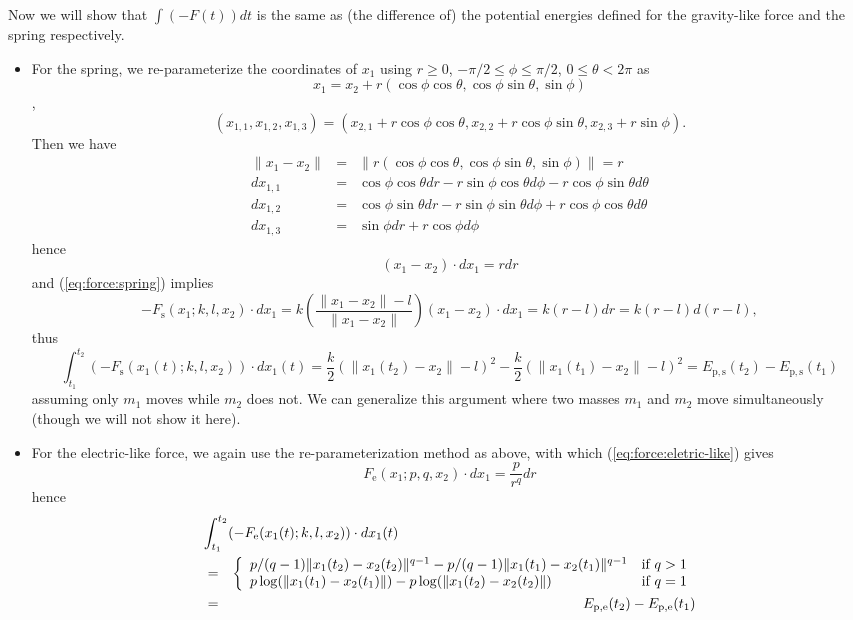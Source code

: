 \documentclass{article}
\begin{document}
Now we will show that $\int (-F(t)) dt $ is the same as (the difference of) the potential energies defined for
the gravity-like force and the spring respectively.
\begin{itemize}
\item
For the spring,
we re-parameterize the coordinates of $x_1$ using $r\geq0$, $-\pi/2\leq \phi \leq \pi/2$, $0\leq \theta < 2\pi$
as
\[
	x_1 = x_2 + r (\cos\phi \cos\theta, \cos\phi \sin\theta, \sin\phi)
\]
\ie,
\[
(x_{1,1}, x_{1,2}, x_{1,3}) = (x_{2,1} + r \cos\phi \cos\theta, x_{2,2} + r \cos\phi \sin\theta, x_{2,3} + r \sin\phi).
\]
Then we have
\begin{eqnarray*}
\|x_1 - x_2\|
&=&
\|
r( \cos\phi \cos\theta,  \cos\phi \sin\theta,  \sin\phi)
\|
=r
\\
d x_{1,1}
&=&
\cos\phi \cos\theta dr
-r\sin\phi \cos\theta d\phi
-r\cos\phi \sin\theta d\theta
\\
d x_{1,2}
&=&
\cos\phi \sin\theta dr
- r \sin\phi \sin\theta d\phi
+ r \cos\phi \cos\theta d\theta
\\
d x_{1,3}
&=&
\sin\phi dr
+ r \cos\phi d\phi
\end{eqnarray*}
hence
\[
(x_1-x_2)\cdot dx_1 = r dr
\]
and
(\ref{eq:force:spring})
implies
\[
-F_\mathrm{s}(x_1;k,l,x_2)\cdot dx_1
=
	k
	\left(
	\frac{\|x_1-x_2\| - l}{\|x_1-x_2\|}
	\right)
	(x_1-x_2)
	\cdot dx_1
= k (r-l) dr
= k (r-l) d(r-l),
\]
thus
\begin{equation}
	\int_{t_1}^{t_2} (-F_\mathrm{s}(x_1(t);k,l,x_2))\cdot dx_1(t)
=
	\frac{k}{2}(\|x_1(t_2)-x_2\|-l)^2
	-
	\frac{k}{2}(\|x_1(t_1)-x_2\|-l)^2
=
	E_\mathrm{p,s}(t_2)
	-
	E_\mathrm{p,s}(t_1)
\end{equation}
assuming only $m_1$ moves while $m_2$ does not.
We can generalize this argument where two masses $m_1$ and $m_2$
move simultaneously (though we will not show it here).

\item For the electric-like force,
we again use the re-parameterization method as above,
with which (\ref{eq:force:eletric-like}) gives
\[
F_\mathrm{e}(x_1;p,q,x_2)\cdot dx_1
= \frac{p}{r^q} dr
\]
hence
\begin{eqnarray}
\nonumber
\lefteqn{
	\int_{t_1}^{t_2} (-F_\mathrm{e}(x_1(t);k,l,x_2))\cdot dx_1(t)
}
\\
\nonumber
&=&
\left\{
\begin{array}{ll}
	p/(q-1)\|x_1(t_2)-x_2(t_2)\|^{q-1}
	-p/(q-1)\|x_1(t_1)-x_2(t_1)\|^{q-1}
	&
	\mbox{if } q>1
	\\
	p\log(\|x_1(t_1)-x_2(t_1)\|)
	- p\log(\|x_1(t_2)-x_2(t_2)\|)
	&
	\mbox{if } q=1
\end{array}
\right.
\\
&=&
	E_\mathrm{p,e}(t_2)
	-
	E_\mathrm{p,e}(t_1)
\end{eqnarray}


\end{itemize}
\end{document}
